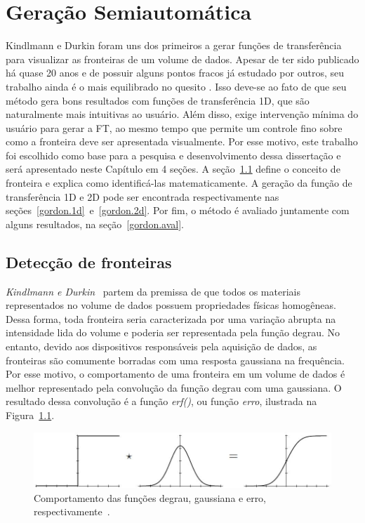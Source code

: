 
\chapter{Geração Semiautomática}
\label{gordon}

	Kindlmann e Durkin foram uns dos primeiros a gerar funções de transferência para visualizar as fronteiras de um volume de dados. Apesar de ter sido publicado há quase 20 anos e de possuir alguns pontos fracos já estudado por outros, seu trabalho ainda é o mais equilibrado no quesito . Isso deve-se ao fato de que seu método gera bons resultados com funções de transferência 1D, que são naturalmente mais intuitivas ao usuário. Além disso, exige intervenção mínima do usuário para gerar a FT, ao mesmo tempo que permite um controle fino sobre como a fronteira deve ser apresentada visualmente. Por esse motivo, este trabalho foi escolhido como base para a pesquisa e desenvolvimento dessa dissertação e será apresentado neste Capítulo em 4 seções. A seção~\ref{gordon.bound} define o conceito de fronteira e explica como identificá-las matematicamente. A geração da função de transferência 1D e 2D pode ser encontrada respectivamente nas seções~\ref{gordon.1d}~e~\ref{gordon.2d}. Por fim, o método é avaliado juntamente com alguns resultados, na seção~\ref{gordon.aval}.
	
\section{Detecção de fronteiras}
\label{gordon.bound}
	\textit{Kindlmann e Durkin}~\cite{gordon} partem da premissa de que todos os materiais representados no volume de dados possuem propriedades físicas homogêneas. Dessa forma, toda fronteira seria caracterizada por uma variação abrupta na intensidade lida do volume e poderia ser representada pela função degrau. No entanto, devido aos dispositivos responsáveis pela aquisição de dados, as fronteiras são comumente borradas com uma resposta gaussiana na frequência. Por esse motivo, o comportamento de uma fronteira em um volume de dados é melhor representado pela convolução da função degrau com uma gaussiana. O resultado dessa convolução é a função \textit{erf()}, ou função \textit{erro}, ilustrada na Figura~\ref{fig:boundary_model}.
	
\begin{figure}[h]
	\centering
	\includegraphics[width=1\textwidth]{images/g_boundary_model}
	\caption{Comportamento das funções degrau, gaussiana e erro, respectivamente~\cite{gordon}.}
	\label{fig:boundary_model}
\end{figure}

